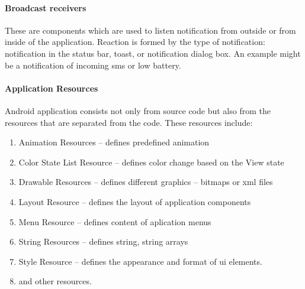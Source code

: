 \paragraph{Broadcast receivers}
These are components which are used to listen notification from outside or from inside of the application. Reaction is formed by the type of notification: notification in the status bar, toast, or notification dialog box. An example might be a notification of incoming sms or low battery.

\paragraph{Application Resources} %
Android application consists not only from source code but also from the resources that are separated from the code. These resources include:
\begin{enumerate}
\item Animation Resources -- defines predefined animation
\item Color State List Resource -- defines color change based on the View state
\item Drawable Resources -- defines different graphics -- bitmaps or xml files
\item Layout Resource -- defines the layout of application components
\item Menu Resource -- defines content of aplication menus
\item String Resources -- defines string, string arrays
\item Style Resource -- defines the appearance and format of ui elements.
\item and other resources.
\end{enumerate}

